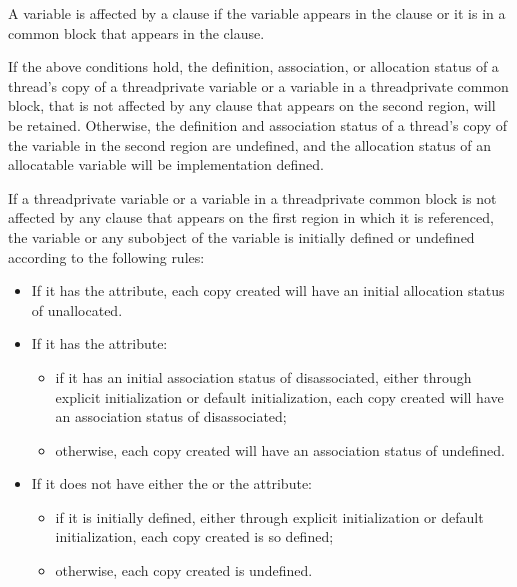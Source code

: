 \begin{fortranspecific}
A variable is affected by a  clause if the variable appears in the  clause
or it is in a common block that appears in the  clause.

If the above conditions hold, the definition, association, or allocation status of a thread's
copy of a threadprivate variable or a variable in a threadprivate common
block, that is not affected by any  clause that appears on the second region, will
be retained. Otherwise, the definition and association status of a thread's copy of the
variable in the second region are undefined, and the allocation status of an allocatable
variable will be implementation defined.

If a threadprivate variable or a variable in a threadprivate common block is
not affected by any  clause that appears on the first  region in which
it is referenced, the variable or any subobject of the variable is initially defined or
undefined according to the following rules:

\begin{itemize} %
\item If it has the  attribute, each copy created will have an initial
allocation status of unallocated.

\item If it has the  attribute:
\begin{itemize} %
\item if it has an initial association status of disassociated, either through explicit
initialization or default initialization, each copy created will have an association
status of disassociated;
\item otherwise, each copy created will have an association status of undefined.
\end{itemize} %

\item If it does not have either the  or the  attribute:

\begin{samepage}\begin{itemize} %
\item if it is initially defined, either through explicit initialization or default
initialization, each copy created is so defined;

\item otherwise, each copy created is undefined.
\end{itemize} %
\end{samepage}

\end{itemize} %
\end{fortranspecific}

